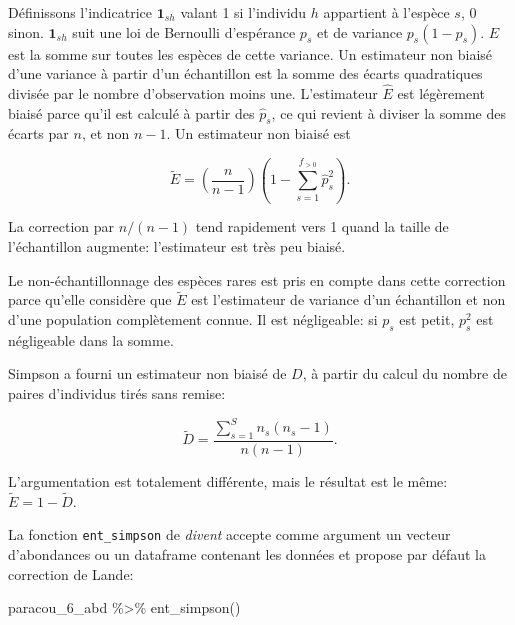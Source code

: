 \documentclass[
  11pt,
  american,
  a4paper,
  extrafontsizes,onecolumn,openright
  ]{memoir}
\newenvironment{Shaded}{\begin{snugshade}}{\end{snugshade}}
\newcommand{\FunctionTok}[1]{\textcolor[rgb]{0.00,0.00,0.00}{#1}}
\newcommand{\NormalTok}[1]{#1}
\newcommand{\SpecialCharTok}[1]{\textcolor[rgb]{0.00,0.00,0.00}{#1}}
\begin{document}
Définissons l'indicatrice \({{\mathbf 1}}_{sh}\) valant 1 si l'individu \(h\) appartient à l'espèce \(s\), 0 sinon.
\({{\mathbf 1}}_{sh}\) suit une loi de Bernoulli d'espérance \(p_s\) et de variance \(p_s \left( 1 - p_s \right)\).
\(E\) est la somme sur toutes les espèces de cette variance.
Un estimateur non biaisé d'une variance à partir d'un échantillon est la somme des écarts quadratiques divisée par le nombre d'observation moins une.
L'estimateur \(\hat{E}\) est légèrement biaisé parce qu'il est calculé à partir des \({\hat{p}}_s\), ce qui revient à diviser la somme des écarts par \(n\), et non \(n-1\).
Un estimateur non biaisé est \autocite{Good1953,Lande1996}

\begin{equation} 
  \label{eq:BiaisSimpson}
  \tilde{E} 
  = \left( \frac{n}{n-1} \right) \left( 1 - \sum^{f_{>0}}_{s=1}{{\hat{p}}^2_s} \right).
\end{equation}

La correction par \(n / (n - 1)\) tend rapidement vers 1 quand la taille de l'échantillon augmente: l'estimateur est très peu biaisé.

Le non-échantillonnage des espèces rares est pris en compte dans cette correction parce qu'elle considère que \(\tilde{E}\) est l'estimateur de variance d'un échantillon et non d'une population complètement connue.
Il est négligeable: si \(p_s\) est petit, \(p^2_s\) est négligeable dans la somme.

Simpson a fourni un estimateur non biaisé de \(D\), à partir du calcul du nombre de paires d'individus tirés sans remise:

\begin{equation}
  \label{eq:EstSimpson1949}
  \tilde{D} 
  = \frac{\sum^{S}_{s=1}{n_s \left( n_s - 1 \right)}}{n \left( n - 1 \right)}.
\end{equation}

L'argumentation est totalement différente, mais le résultat est le même: \(\tilde{E}=1-\tilde{D}\).

La fonction \texttt{ent\_simpson} de \emph{divent} accepte comme argument un vecteur d'abondances ou un dataframe contenant les données et propose par défaut la correction de Lande:

\scriptsize

\begin{Shaded}
\begin{Highlighting}[]
\NormalTok{paracou\_6\_abd }\SpecialCharTok{\%\textgreater{}\%} 
  \FunctionTok{ent\_simpson}\NormalTok{()}
\end{Highlighting}
\end{Shaded}
\end{document}
